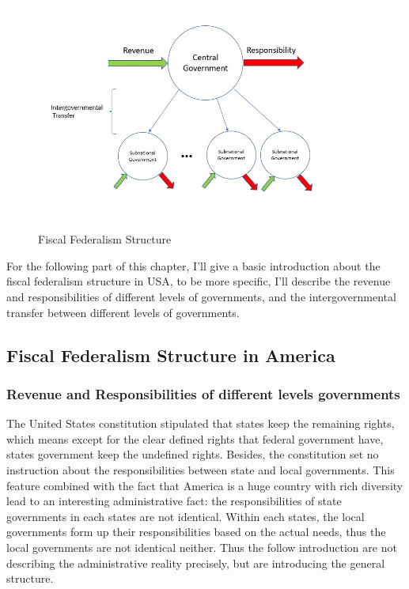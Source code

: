 \begin{figure}[htb]
    \centering
    \includegraphics[scale=0.7]{Chapter-1/Figures/fiscal federalism.JPG}
    \caption[Fiscal Federalism Structure]{Fiscal Federalism Structure
        \texttt{} }
    \label{Figure 1.1}
\end{figure}

For the following part of this chapter, I'll give a basic introduction about the fiscal federalism structure in USA, to be more specific, I'll describe the revenue and responsibilities of different levels of governments, and the intergovernmental transfer between different levels of governments.



\subsection{Fiscal Federalism Structure in America}
\subsubsection{Revenue and Responsibilities of different levels governments}
The United States constitution stipulated that states keep the remaining rights, which means except for the clear defined rights that federal government have, states government keep the undefined rights. Besides, the constitution set no instruction about the responsibilities between state and local governments. This feature combined with the fact that America is a huge country with rich diversity lead to an interesting administrative fact: the responsibilities of state governments in each states are not identical. Within each states, the local governments form up their responsibilities based on the actual needs, thus the local governments are not identical neither. Thus the follow introduction are not describing the administrative reality precisely, but are introducing the general structure.

